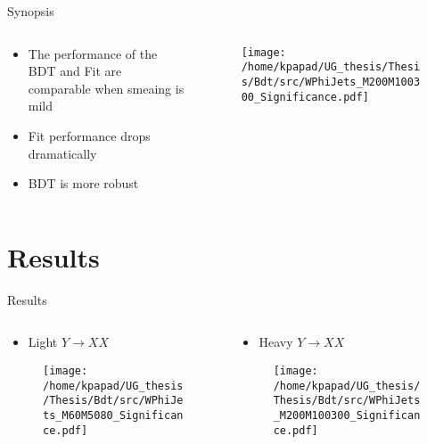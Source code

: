 \documentclass[bigger]{beamer}
\begin{document}
\begin{frame}[label={sec:org4d43ecc}]{Synopsis}
\begin{columns}
\begin{column}{0.5\columnwidth}
\begin{itemize}
\item The performance of the BDT and Fit are comparable when smeaing is mild
\item Fit performance drops dramatically
\item BDT is more robust
\end{itemize}
\end{column}

\begin{column}{0.5\columnwidth}
\begin{figure}
\centering
\texttt{[image: /home/kpapad/UG\_thesis/Thesis/Bdt/src/WPhiJets\_M200M100300\_Significance.pdf]}
\end{figure}
\end{column}
\end{columns}
\end{frame}

\section{Results}
\label{sec:orgca35bba}
\begin{frame}[label={sec:orgca98d5c}]{Results}
\begin{columns}
\begin{column}{0.5\columnwidth}
\begin{itemize}
\item Light \(Y \rightarrow XX\)
\end{itemize}
\begin{figure}
\centering
\texttt{[image: /home/kpapad/UG\_thesis/Thesis/Bdt/src/WPhiJets\_M60M5080\_Significance.pdf]}
\end{figure}
\end{column}

\begin{column}{0.5\columnwidth}
\begin{itemize}
\item Heavy \(Y \rightarrow XX\)
\end{itemize}
\begin{figure}
\centering
\texttt{[image: /home/kpapad/UG\_thesis/Thesis/Bdt/src/WPhiJets\_M200M100300\_Significance.pdf]}
\end{figure}
\end{column}
\end{columns}
\end{frame}
\end{document}
